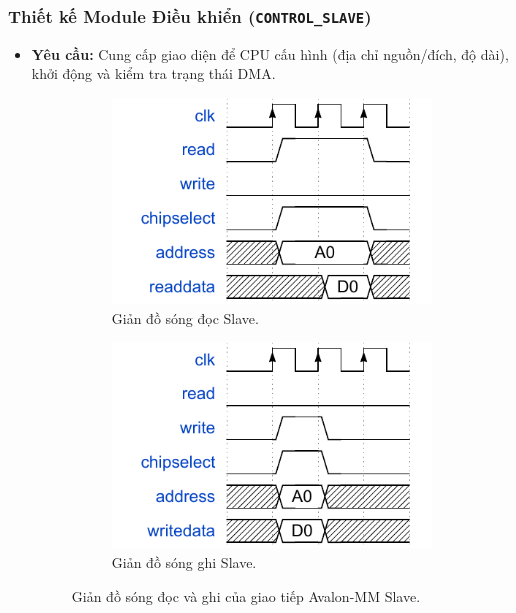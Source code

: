 \subsubsection{Thiết kế Module Điều khiển (\texttt{CONTROL\_SLAVE})}
\begin{itemize}
    \item \textbf{Yêu cầu:} Cung cấp giao diện để CPU cấu hình (địa chỉ nguồn/đích, độ dài), khởi động và kiểm tra trạng thái DMA.
    
    \begin{figure}[htbp]
        \centering
        \begin{subfigure}[b]{0.48\textwidth}
            \centering
            \includegraphics[width=\linewidth]{Images/02_03_AvalonSlave_ReadWaveform.pdf}
            \caption{Giản đồ sóng đọc Slave.}
            \label{fig:02_03_avalon_slave_read_sub}
        \end{subfigure}
        \hfill
        \begin{subfigure}[b]{0.48\textwidth}
            \centering
            \includegraphics[width=\linewidth]{Images/02_04_AvalonSlave_WriteWaveform.pdf}
            \caption{Giản đồ sóng ghi Slave.}
            \label{fig:02_04_avalon_slave_write_sub}
        \end{subfigure}
        \caption{Giản đồ sóng đọc và ghi của giao tiếp Avalon-MM Slave.}
        \label{fig:avalon_slave_waveforms}
    \end{figure}
    

\end{itemize}
